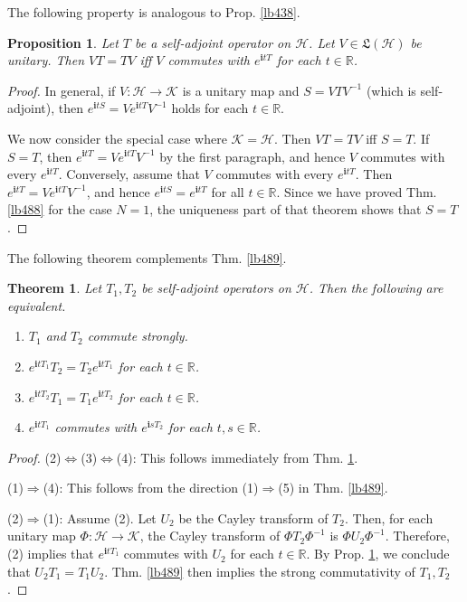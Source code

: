 \documentclass[12pt,b5paper,notitlepage]{article}
\theoremstyle{definition}
\theoremstyle{plain}
\newtheorem{thm}[df]{Theorem}
\newtheorem{pp}[df]{Proposition}
\newcommand{\fk}{\mathfrak}
\newcommand{\im}{\mathbf{i}}
\newcommand{\Rbb}{\mathbb R}
\newcommand{\MH}{\mathcal H}
\newcommand{\MK}{\mathcal K}
\numberwithin{equation}{section}
\begin{document}
The following property is analogous to Prop. \ref{lb438}.

\begin{pp}\label{lb503}
Let $T$ be a self-adjoint operator on $\MH$. Let $V\in\fk L(\MH)$ be unitary. Then $VT=TV$ iff $V$ commutes with $e^{\im t T}$ for each $t\in\Rbb$. 
\end{pp}


\begin{proof}
In general, if $V:\MH\rightarrow\MK$ is a unitary map and $S=V TV^{-1}$ (which is self-adjoint), then $e^{\im t S}=Ve^{\im t T}V^{-1}$ holds for each $t\in\Rbb$.

We now consider the special case where $\MK=\MH$. Then $VT=TV$ iff $S=T$. If $S=T$, then $e^{\im t T}=Ve^{\im tT}V^{-1}$ by the first paragraph, and hence $V$ commutes with every $e^{\im tT}$. Conversely, assume that $V$ commutes with every $e^{\im tT}$. Then $e^{\im t T}=Ve^{\im tT}V^{-1}$, and hence $e^{\im tS}=e^{\im tT}$ for all $t\in\Rbb$. Since we have proved Thm. \ref{lb488} for the case $N=1$, the uniqueness part of that theorem shows that $S=T$.
\end{proof}


The following theorem complements Thm. \ref{lb489}.


\begin{thm}\label{lb505}
Let $T_1,T_2$ be self-adjoint operators on $\MH$. Then the following are equivalent.
\begin{enumerate}[label=(\arabic*)]
\item $T_1$ and $T_2$ commute strongly.
\item $e^{\im tT_1}T_2=T_2e^{\im tT_1}$ for each $t\in\Rbb$.
\item $e^{\im tT_2}T_1=T_1e^{\im tT_2}$ for each $t\in\Rbb$.
\item $e^{\im tT_1}$ commutes with $e^{\im sT_2}$ for each $t,s\in\Rbb$.
\end{enumerate}
\end{thm}

\begin{proof}
(2)$\Leftrightarrow$(3)$\Leftrightarrow$(4): This follows immediately from Thm. \ref{lb503}. 

(1)$\Rightarrow$(4): This follows from the direction (1)$\Rightarrow$(5) in Thm. \ref{lb489}.

(2)$\Rightarrow$(1): Assume (2). Let $U_2$ be the Cayley transform of $T_2$. Then, for each unitary map $\Phi:\MH\rightarrow\MK$, the Cayley transform of $\Phi T_2\Phi^{-1}$ is $\Phi U_2\Phi^{-1}$. Therefore, (2) implies that $e^{\im tT_1}$ commutes with $U_2$ for each $t\in\Rbb$. By Prop. \ref{lb503}, we conclude that $U_2T_1=T_1U_2$. Thm. \ref{lb489} then implies the strong commutativity of $T_1,T_2$.
\end{proof}
\end{document}
